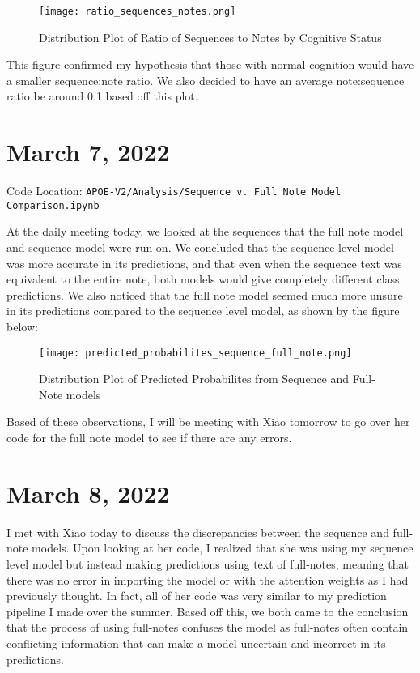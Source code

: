\documentclass[11pt,letterpaper]{article}
\begin{document}
\begin{figure}[ht!]
\centering
\texttt{[image: ratio\_sequences\_notes.png]}
\caption{Distribution Plot of Ratio of Sequences to Notes by Cognitive Status}
\end{figure}

This figure confirmed my hypothesis that those with normal cognition would have a smaller sequence:note ratio. We also decided to have an average note:sequence ratio be around 0.1 based off this plot. 

\section{March 7, 2022}

Code Location: \texttt{APOE-V2/Analysis/Sequence v. Full Note Model Comparison.ipynb}

At the daily meeting today, we looked at the sequences that the full note model and sequence model were run on. We concluded that the sequence level model was more accurate in its predictions, and that even when the sequence text was equivalent to the entire note, both models would give completely different class predictions. We also noticed that the full note model seemed much more unsure in its predictions compared to the sequence level model, as shown by the figure below:

\begin{figure}[ht!]
\centering
\texttt{[image: predicted\_probabilites\_sequence\_full\_note.png]}
\caption{Distribution Plot of Predicted Probabilites from Sequence and Full-Note models}
\end{figure}

Based of these observations, I will be meeting with Xiao tomorrow to go over her code for the full note model to see if there are any errors. 

\section{March 8, 2022}

I met with Xiao today to discuss the discrepancies between the sequence and full-note models. Upon looking at her code, I realized that she was using my sequence level model but instead making predictions using text of full-notes, meaning that there was no error in importing the model or with the attention weights as I had previously thought. In fact, all of her code was very similar to my prediction pipeline I made over the summer. Based off this, we both came to the conclusion that the process of using full-notes confuses the model as full-notes often contain conflicting information that can make a model uncertain and incorrect in its predictions.
\end{document}
